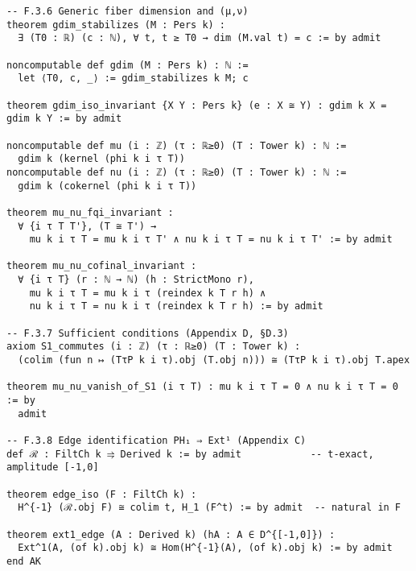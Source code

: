 \documentclass[11pt]{article}
\numberwithin{equation}{section}
\theoremstyle{definition}
\begin{document}
\begin{verbatim}
-- F.3.6 Generic fiber dimension and (μ,ν)
theorem gdim_stabilizes (M : Pers k) :
  ∃ (T0 : ℝ) (c : ℕ), ∀ t, t ≥ T0 → dim (M.val t) = c := by admit

noncomputable def gdim (M : Pers k) : ℕ :=
  let ⟨T0, c, _⟩ := gdim_stabilizes k M; c

theorem gdim_iso_invariant {X Y : Pers k} (e : X ≅ Y) : gdim k X = gdim k Y := by admit

noncomputable def mu (i : ℤ) (τ : ℝ≥0) (T : Tower k) : ℕ :=
  gdim k (kernel (phi k i τ T))
noncomputable def nu (i : ℤ) (τ : ℝ≥0) (T : Tower k) : ℕ :=
  gdim k (cokernel (phi k i τ T))

theorem mu_nu_fqi_invariant :
  ∀ {i τ T T'}, (T ≅ T') →
    mu k i τ T = mu k i τ T' ∧ nu k i τ T = nu k i τ T' := by admit

theorem mu_nu_cofinal_invariant :
  ∀ {i τ T} (r : ℕ → ℕ) (h : StrictMono r),
    mu k i τ T = mu k i τ (reindex k T r h) ∧
    nu k i τ T = nu k i τ (reindex k T r h) := by admit

-- F.3.7 Sufficient conditions (Appendix D, §D.3)
axiom S1_commutes (i : ℤ) (τ : ℝ≥0) (T : Tower k) :
  (colim (fun n ↦ (TτP k i τ).obj (T.obj n))) ≅ (TτP k i τ).obj T.apex

theorem mu_nu_vanish_of_S1 (i τ T) : mu k i τ T = 0 ∧ nu k i τ T = 0 := by
  admit

-- F.3.8 Edge identification PH₁ ⇒ Ext¹ (Appendix C)
def ℛ : FiltCh k ⥤ Derived k := by admit            -- t-exact, amplitude [-1,0]

theorem edge_iso (F : FiltCh k) :
  H^{-1} (ℛ.obj F) ≅ colim t, H_1 (F^t) := by admit  -- natural in F

theorem ext1_edge (A : Derived k) (hA : A ∈ D^{[-1,0]}) :
  Ext^1(A, (of k).obj k) ≅ Hom(H^{-1}(A), (of k).obj k) := by admit
end AK
\end{verbatim}
\end{document}
